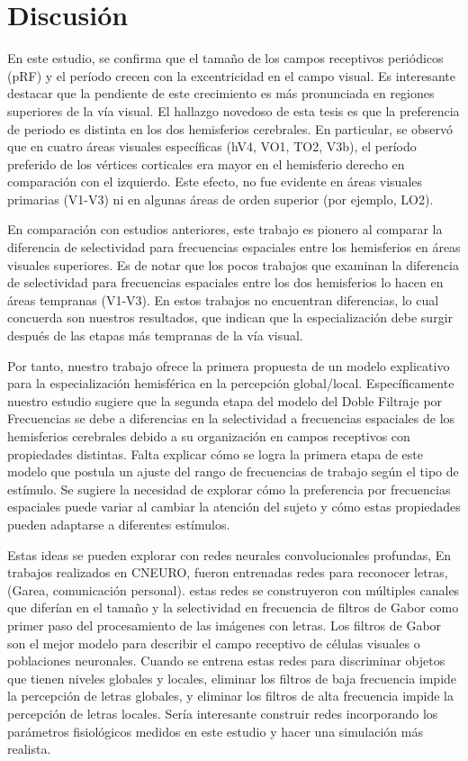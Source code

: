 \chapter{Discusi\'on}\label{chapter:discussion}

En este estudio, se confirma que el tamaño de los campos receptivos periódicos (pRF) y el período crecen con la excentricidad en el campo visual. Es interesante destacar que la pendiente de este crecimiento es más pronunciada en regiones superiores de la vía visual. El hallazgo novedoso de esta tesis es que la preferencia de periodo es distinta en los dos hemisferios cerebrales. En particular, se observó que en cuatro áreas visuales específicas (hV4, VO1, TO2, V3b), el período preferido de los vértices corticales era mayor en el hemisferio derecho en comparación con el izquierdo. Este efecto, no fue evidente en áreas visuales primarias (V1-V3) ni en algunas áreas de orden superior (por ejemplo, LO2).

En comparación con estudios anteriores, este trabajo es pionero al comparar la diferencia de selectividad para frecuencias espaciales entre los hemisferios en áreas visuales superiores. Es de notar que los pocos trabajos que examinan la diferencia de selectividad para frecuencias espaciales entre los dos hemisferios lo hacen en áreas tempranas (V1-V3). En estos trabajos no encuentran diferencias, lo cual concuerda son nuestros resultados, que indican que la especialización debe surgir después de las etapas más tempranas de la vía visual. 

Por tanto, nuestro trabajo ofrece la primera propuesta de un modelo explicativo para la especialización hemisférica en la percepción global/local. Específicamente nuestro estudio sugiere que la segunda etapa del modelo del Doble Filtraje por Frecuencias se debe a diferencias en la selectividad a frecuencias espaciales de los hemisferios cerebrales debido a su organización en campos receptivos con propiedades distintas.  Falta explicar cómo se logra la primera etapa de este modelo que postula un ajuste del rango de frecuencias de trabajo según el tipo de estímulo. Se sugiere la necesidad de explorar cómo la preferencia por frecuencias espaciales puede variar al cambiar la atención del sujeto y cómo estas propiedades pueden adaptarse a diferentes estímulos.

Estas ideas se pueden explorar con redes neurales convolucionales profundas, En trabajos realizados en CNEURO, fueron entrenadas redes para reconocer letras, (Garea, comunicación personal). estas redes se construyeron con múltiples canales que diferían en el tamaño y la selectividad en frecuencia de filtros de Gabor como primer paso del procesamiento de las imágenes con letras. Los filtros de Gabor son el mejor modelo para describir el campo receptivo de células visuales o poblaciones neuronales. Cuando se entrena estas redes para discriminar objetos que tienen niveles globales y locales, eliminar los filtros de baja frecuencia impide la percepción de letras globales, y eliminar los filtros de alta frecuencia impide la percepción de letras locales. Sería interesante construir redes incorporando los parámetros fisiológicos medidos en este estudio y hacer una simulación más realista.